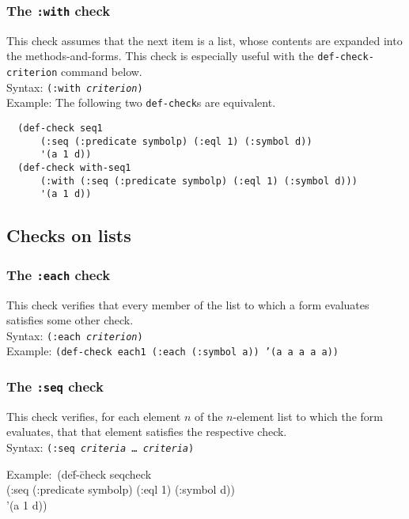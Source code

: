 \documentclass{article}
\begin{document}
\subsubsection{The \texttt{:with} check}
\par
This check assumes that the next item is a list, whose contents are
expanded into the methods-and-forms. This
check is especially useful with the \texttt{def-check-cri\-ter\-ion}
command below.
\\ Syntax: \texttt{(:with \emph{criterion})}
\\ Example: The following two \texttt{def-check}s are equivalent.
\begin{verbatim}
  (def-check seq1
      (:seq (:predicate symbolp) (:eql 1) (:symbol d))
      '(a 1 d))
  (def-check with-seq1
      (:with (:seq (:predicate symbolp) (:eql 1) (:symbol d)))
      '(a 1 d))
\end{verbatim}

\subsection{Checks on lists}

\subsubsection{The \texttt{:each} check}
This check verifies that every member of the list to which a form
evaluates satisfies some other check.
\\ Syntax: \texttt{(:each \emph{criterion})}
\\ Example: \texttt{(def-check each1 (:each (:symbol a)) '(a a a a a))}

\subsubsection{The \texttt{:seq} check}
This check verifies, for each element $n$ of the $n$-element list to
which the form evaluates, that that element satisfies the respective
check.
\\ Syntax: \texttt{(:seq \emph{criteria} \ldots\ \emph{criteria})}
{\ttfamily\begin{tabbing}
\textrm{Example:}\ (de\=f-\=check seqcheck
\\ \>\>  (:seq (:predicate symbolp) (:eql 1) (:symbol d))
\\ \>  '(a 1 d))
\end{tabbing}}
\end{document}

